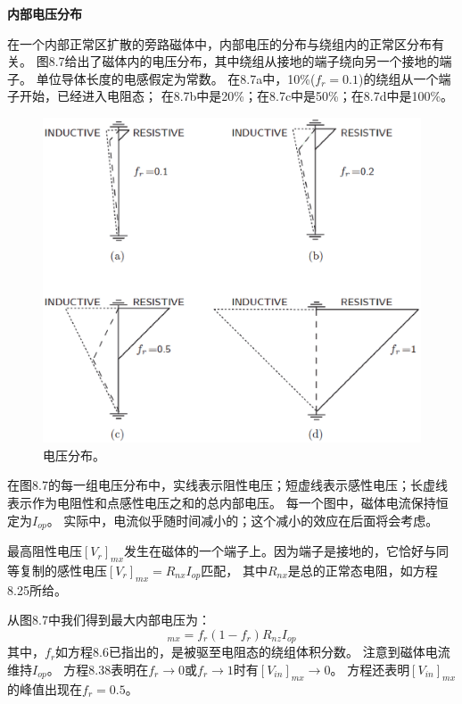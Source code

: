 \textbf{内部电压分布}

在一个内部正常区扩散的旁路磁体中，内部电压的分布与绕组内的正常区分布有关。
图8.7给出了磁体内的电压分布，其中绕组从接地的端子绕向另一个接地的端子。
单位导体长度的电感假定为常数。
在8.7a中，10\%($f_r=0.1$)的绕组从一个端子开始，已经进入电阻态；
在8.7b中是20\%；在8.7c中是50\%；在8.7d中是100\%。

\begin{figure}
	\centering
	\includegraphics[scale=0.5]{chpt8/figs/fig8.7.eps}
	\caption{电压分布。}
\end{figure}

在图8.7的每一组电压分布中，实线表示阻性电压；短虚线表示感性电压；长虚线表示作为电阻性和点感性电压之和的总内部电压。
每一个图中，磁体电流保持恒定为$I_{op}$。
实际中，电流似乎随时间减小的；这个减小的效应在后面将会考虑。

最高阻性电压$[V_r]_{mx}$发生在磁体的一个端子上。因为端子是接地的，它恰好与同等复制的感性电压$[V_r]_{mx}=R_{nx}I_{op}$匹配，
其中$R_{nx}$是总的正常态电阻，如方程8.25所给。

从图8.7中我们得到最大内部电压为：
\begin{equation}%
[V_{in}]_{mx}=f_r(1-f_r)R_{nz}I_{op}
\end{equation}
其中，$f_r$如方程8.6已指出的，是被驱至电阻态的绕组体积分数。
注意到磁体电流维持$I_{op}$。
方程8.38表明在$f_r\rightarrow 0$或$f_r\rightarrow 1$时有$[V_{in}]_{mx}\rightarrow 0$。
方程还表明$[V_{in}]_{mx}$的峰值出现在$f_r=0.5$。

